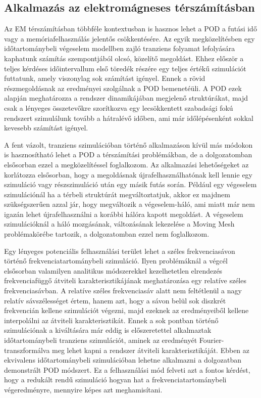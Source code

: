         \subsection{Alkalmazás az elektromágneses térszámításban}
            \label{sec:empod}
            Az EM térszámításban többféle kontextusban is hasznos lehet a POD a futási idő  vagy a memóriafelhasználás jelentős csökkentésére. Az egyik megközelítésben egy időtartománybeli végeselem modellben zajló tranziens folyamat lefolyására kaphatunk számítás szempontjából olcsó, közelítő megoldást. Ehhez először a teljes kérdéses időintervallum első töredék részére egy teljes értékű szimulációt futtatunk, amely viszonylag sok számítást igényel. Ennek a rövid részmegoldásnak az eredményei szolgálnak a POD bemenetéüli. A POD ezek alapján meghatározza a rendszer dinamikájában megjelenő struktúrákat, majd csak a lényeges összetevőkre szorítkozva egy lecsökkentett szabadsági fokú rendszert szimulálunk tovább a hátralévő időben, ami már időlépésenként sokkal kevesebb számítást igényel.
            \par
            A fent vázolt, tranziens szimulációban történő alkalmazáson kívül más módokon is hasznosítható lehet a POD a térszámítási problémákban, de a dolgozatomban elsősorban ezzel a megközelítéssel foglalkozom. Az alkalmazási lehetőségeket az korlátozza elsősorban, hogy a megoldásnak újrafelhasználhatónak kell lennie egy szimuláció vagy részszimuláció után egy másik futás során. Például egy végeselem szimulációnál ha a térbeli struktúrát megváltoztatjuk, akkor ez majdnem szükségszerűen azzal jár, hogy megváltozik a végeselem-háló, ami miatt már nem igazán lehet újrafelhasználni a korábbi hálóra kapott megoldást. A végeselem szimulációknál a háló mozgásának, változásának lekezelése a Moving Mesh problémakörébe tartozik, a dolgozatomban ezzel nem foglalkozom.
            \par
            Egy lényeges potenciális felhasználási terület lehet a széles frekvenciasávon történő frekvenciatartománybeli szimuláció. Ilyen problémáknál a végcél elsősorban valamilyen analitikus módszerekkel kezelhetetlen elrendezés frekvenciafüggő átviteli karakterisztikájának meghatározása egy relatíve széles frekvenciasávban. A relatíve széles frekvenciasáv alatt nem feltétlenül a nagy relatív sávszélességet értem, hanem azt, hogy a sávon belül sok diszkrét frekvencián kellene szimulációt végezni, majd ezeknek az eredményeiből kellene interpolálni az átviteli karakterisztikát. Ennek a sok pontban történő szimulációnak a kiváltására már eddig is előszeretettel alkalmaztak időtartománybeli tranziens szimulációt, aminek az eredményét Fourier-transzformálva meg lehet kapni a rendszer átviteli karakterisztikáját. Ebben az ekvivalens időtartománybeli szimulációban lehetne alkalmazni a dolgozatban demonstrált POD módszert. Ez a felhasználási mód felveti azt a fontos kérdést, hogy a redukált rendű szimuláció hogyan hat a frekvenciatartománybeli végeredményre, mennyire képes azt meghamisítani.
